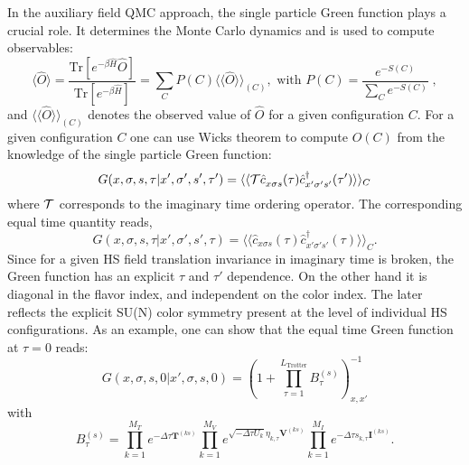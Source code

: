 In the auxiliary field QMC approach, the single particle Green function plays a crucial role.  It determines the Monte Carlo dynamics and is used to compute  observables:
\begin{equation}\label{eqn:obs}
\langle \hat{O}  \rangle  = \frac{ \text{Tr}   \left[ e^{- \beta \hat{H}}  \hat{O}   \right] }{ \text{Tr}   \left[ e^{- \beta \hat{H}}  \right] } =   \sum_{C}   P(C) 
   \langle \langle \hat{O}  \rangle \rangle_{(C)} , \text{   with   } 
  P(C)   = \frac{ e^{-S(C)}}{\sum_C e^{-S(C)}}\;,
\end{equation}
and $\langle \langle \hat{O}  \rangle \rangle_{(C)} $ denotes the observed value of $\hat{O}$ for a given configuration $C$.
For a given configuration $C$  one can use Wicks theorem to compute $O (C) $   from the knowledge of the single particle Green function: 
\begin{equation}
       G( x,\sigma,s, \tau |    x',\sigma',s', \tau')   =       \langle \langle {\cal T} \hat{c}^{\phantom\dagger}_{x \sigma s} (\tau)  \hat{c}^{\dagger}_{x' \sigma' s'} (\tau') \rangle \rangle_{C}
\end{equation}
where $ {\cal T} $ corresponds to the imaginary time ordering operator.   The  corresponding equal time quantity reads, 
\begin{equation}
       G( x,\sigma,s, \tau |    x',\sigma',s', \tau)   =       \langle \langle  \hat{c}^{\phantom\dagger}_{x \sigma s} (\tau)  \hat{c}^{\dagger}_{x' \sigma' s'} (\tau) \rangle \rangle_{C}.
\end{equation}
Since  for a given HS field translation invariance in imaginary time is broken, the Green function has an explicit $\tau$ and $\tau'$ dependence.   On the other hand it is diagonal in the flavor index, and independent on the color index. The later reflects the  explicit SU(N)   color symmetry present at the level of individual HS configurations.   As an example,  one can show that the equal time Green function at $\tau = 0$ reads:
\begin{equation}
G(x,\sigma,s,0| x',\sigma,s,0 )  =   \left(  1  +  \prod_{\tau = 1}^{L_{\text{Trotter}}}  B_{\tau}^{(s)}   \right)^{-1}_{x,x'}
\end{equation}
with
\begin{equation}
	B_{\tau}^{(s)} =  \prod_{k=1}^{M_T}   e^{-\Delta \tau {\bm T}^{(ks)}}  
    \prod_{k=1}^{M_V}   e^{  \sqrt{ -\Delta \tau  U_k} \eta_{k,\tau} {\bm V}^{(ks)} }   \prod_{k=1}^{M_I}   e^{  -\Delta \tau s_{k,\tau}  {\bm I}^{(ks)}}.
\end{equation}


